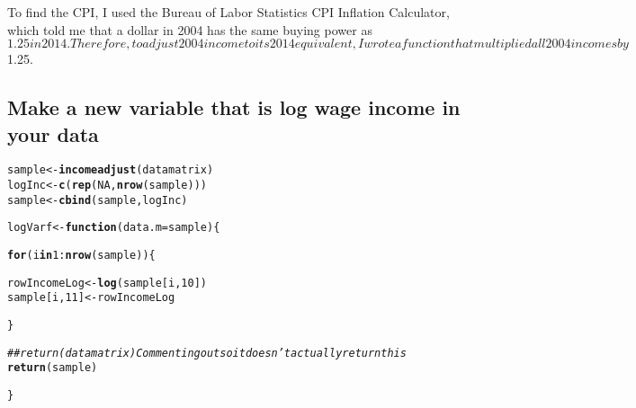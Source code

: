 \documentclass{article}\usepackage[]{graphicx}\usepackage[]{color}
\makeatletter
\newcommand{\hlnum}[1]{\textcolor[rgb]{0.686,0.059,0.569}{#1}}%
\newcommand{\hlcom}[1]{\textcolor[rgb]{0.678,0.584,0.686}{\textit{#1}}}%
\newcommand{\hlopt}[1]{\textcolor[rgb]{0,0,0}{#1}}%
\newcommand{\hlstd}[1]{\textcolor[rgb]{0.345,0.345,0.345}{#1}}%
\newcommand{\hlkwa}[1]{\textcolor[rgb]{0.161,0.373,0.58}{\textbf{#1}}}%
\newcommand{\hlkwb}[1]{\textcolor[rgb]{0.69,0.353,0.396}{#1}}%
\newcommand{\hlkwc}[1]{\textcolor[rgb]{0.333,0.667,0.333}{#1}}%
\newcommand{\hlkwd}[1]{\textcolor[rgb]{0.737,0.353,0.396}{\textbf{#1}}}%
\newenvironment{kframe}{%
 \def\at@end@of@kframe{}%
 \ifinner\ifhmode%
  \def\at@end@of@kframe{\end{minipage}}%
  \begin{minipage}{\columnwidth}%
 \fi\fi%
 \def\FrameCommand##1{\hskip\@totalleftmargin \hskip-\fboxsep
 \colorbox{shadecolor}{##1}\hskip-\fboxsep
     \hskip-\linewidth \hskip-\@totalleftmargin \hskip\columnwidth}%
 \MakeFramed {\advance\hsize-\width
   \@totalleftmargin\z@ \linewidth\hsize
   \@setminipage}}%
 {\par\unskip\endMakeFramed%
 \at@end@of@kframe}
\newenvironment{knitrout}{}{} %
\makeatother
\begin{document}
To find the CPI, I used the Bureau of Labor Statistics CPI Inflation Calculator, which told me that a dollar in 2004 has the same buying power as $1.25 in 2014. Therefore, to adjust 2004 income to its 2014 equivalent, I wrote a function that multiplied all 2004 incomes by $1.25.

\subsection{Make a new variable that is log wage income in your data}

\begin{knitrout}
\color{fgcolor}\begin{kframe}
\begin{alltt}
\hlstd{sample} \hlkwb{<-} \hlkwd{incomeadjust}\hlstd{(datamatrix)}
\hlstd{logInc} \hlkwb{<-} \hlkwd{c}\hlstd{(}\hlkwd{rep}\hlstd{(}\hlnum{NA}\hlstd{,} \hlkwd{nrow}\hlstd{(sample)))}
\hlstd{sample} \hlkwb{<-} \hlkwd{cbind}\hlstd{(sample, logInc)}



\hlstd{logVarf} \hlkwb{<-} \hlkwa{function}\hlstd{(}\hlkwc{data.m} \hlstd{= sample)\{}

  \hlkwa{for} \hlstd{(i} \hlkwa{in} \hlnum{1}\hlopt{:}\hlkwd{nrow}\hlstd{(sample))\{}

    \hlstd{rowIncomeLog} \hlkwb{<-} \hlkwd{log}\hlstd{(sample[i,}\hlnum{10}\hlstd{])}
    \hlstd{sample[i,}\hlnum{11}\hlstd{]} \hlkwb{<-} \hlstd{rowIncomeLog}

  \hlstd{\}}

  \hlcom{## return(datamatrix) Commenting out so it doesn't actually return this}
  \hlkwd{return}\hlstd{(sample)}

\hlstd{\}}


\end{alltt}
\end{kframe}
\end{knitrout}
\end{document}
